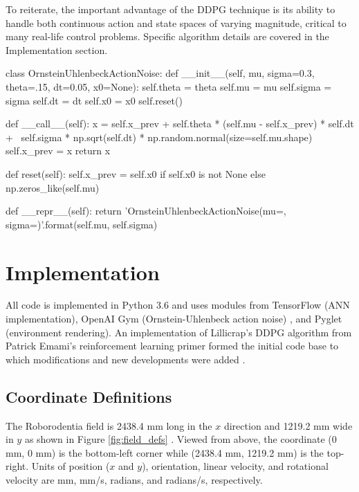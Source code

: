 To reiterate, the important advantage of the DDPG technique is its ability to handle both continuous action and state spaces of varying magnitude, critical to many real-life control problems. Specific algorithm details are covered in the Implementation section.

\begin{python}[caption={Ornstein-Uhlenbeck Action Noise \cite{ddpg_noise}},label={list:ornstein-uhlenbeck}]
class OrnsteinUhlenbeckActionNoise:
    def __init__(self, mu, sigma=0.3, theta=.15, dt=0.05, x0=None):
        self.theta = theta
        self.mu = mu
        self.sigma = sigma
        self.dt = dt
        self.x0 = x0
        self.reset()

    def __call__(self):
        x = self.x_prev + self.theta * (self.mu - self.x_prev) * self.dt + \
                self.sigma * np.sqrt(self.dt) * np.random.normal(size=self.mu.shape)
        self.x_prev = x
        return x

    def reset(self):
        self.x_prev = self.x0 if self.x0 is not None else np.zeros_like(self.mu)

    def __repr__(self):
        return 'OrnsteinUhlenbeckActionNoise(mu={}, sigma={})'.format(self.mu, self.sigma)
\end{python}

\section{Implementation}
All code is implemented in Python 3.6 and uses modules from TensorFlow \cite{tensorflow} (ANN implementation), OpenAI Gym (Ornstein-Uhlenbeck action noise) \cite{openaigym}, and Pyglet (environment rendering). An implementation of Lillicrap's DDPG algorithm from Patrick Emami's reinforcement learning primer formed the initial code base to which modifications and new developments were added \cite{emami_2016}.


\subsection{Coordinate Definitions}
The Roborodentia field is 2438.4 mm long in the $x$ direction and 1219.2 mm wide in $y$ as shown in Figure \ref{fig:field_defs} \cite{roborodentia}. Viewed from above, the coordinate (0 mm, 0 mm) is the bottom-left corner while (2438.4 mm, 1219.2 mm) is the top-right. Units of position ($x$ and $y$), orientation, linear velocity, and rotational velocity are mm, mm/s, radians, and radians/s, respectively.


